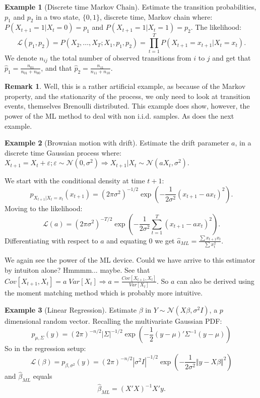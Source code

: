 \documentclass[12pt,a4paper]{article}
\theoremstyle{plain}
\theoremstyle{definition}
\newtheorem{remark}{Remark}
\newtheorem{example}{Example}
\newcommand{\gauss}[1]{\mathcal{N}(#1)}
\newcommand{\norm}[1]{\Vert #1 \Vert}
\newcommand{\lik}{\mathcal{L}}
\begin{document}
\begin{example}[Discrete time Markov Chain]

Estimate the transition probabilities,  $p_1$ and $p_2$ in a two state, $\{0,1\}$, discrete time, Markov chain where:
$P(X_{t+1}=1|X_{t}=0)=p_1$ and $P(X_{t+1}=1|X_{t}=1)=p_2$.
The likelihood:
$$
  \lik(p_1,p_2)=
  P(X_2,\dots,X_T;X_1,p_1,p_2)=
  \prod_{t=1}^T P(X_{t+1}=x_{t+1}|X_{t}=x_t).
$$
We denote $n_{ij}$ the total number of observed transitions from $i$ to $j$ and get that $\hat{p}_1=\frac{n_{01}}{n_{01}+n_{00}}$, and that $\hat{p}_2=\frac{n_{11}}{n_{11}+n_{10}}$.

\begin{remark}
Well, this is a rather artificial example, as because of the Markov property, and the stationarity of the process, we only need to look at transition events, themselves Brenoulli distributed. 
This example does show, however, the power of the ML method to deal with non i.i.d. samples. As does the next example.
\end{remark}
\end{example}

\begin{example}[Brownian motion with drift]
Estimate the drift parameter $a$,  in a discrete time Gaussian process where:
$X_{t+1}=X_t+\varepsilon; \varepsilon \sim \gauss{0,\sigma^2} \Rightarrow X_{t+1}|X_t \sim \gauss{a X_t,\sigma^2}$.

We start with the conditional density at time $t+1$:
$$
  p_{X_{t+1}|X_t=x_t}(x_{t+1}) = 
  (2 \pi \sigma^2)^{-1/2} \exp \left( 
    -\frac{1}{2 \sigma^2}(x_{t+1}-a x_t)^2 
  \right).
$$
Moving to the likelihood:
$$
  \lik(a) = 
  (2 \pi \sigma^2)^{-T/2} \exp \left(
    -\frac{1}{2 \sigma^2}\sum_{t=1}^T (x_{t+1}-a x_t)^2 
  \right).
$$
Differentiating with respect to $a$ and equating $0$ we get $\hat{a}_{ML}=\frac{\sum x_{t+1}x_{t}}{\sum x_t^2}$.

We again see the power of the ML device.
Could we have arrive to this estimator by intuiton alone? Hmmmm... maybe. 
See that $Cov[X_{t+1},X_t] = a \; Var[X_t] \Rightarrow a=\frac{Cov[X_{t+1},X_t]}{Var[X_t]}$.
So $a$ can also be derived using the moment matching method which is probably more intuitive.

\end{example}

\begin{example}[Linear Regression]

Estimate $\beta$ in $Y \sim \gauss{X\beta,\sigma^2 I}$, a $p$ dimensional random vector.
Recalling the multivariate Gaussian PDF:
$$
  p_{\mu,\Sigma}(y) = 
  (2 \pi)^{-n/2} |\Sigma|^{-1/2} \exp\left(
    -\frac{1}{2} (y-\mu)' \Sigma^{-1} (y-\mu)
  \right)
$$
So in the regression setup:
$$
  \lik(\beta)= 
  p_{\beta,\sigma^2}(y) = 
  (2 \pi)^{-n/2} |\sigma^2 I|^{-1/2} \exp\left(
    -\frac{1}{2 \sigma^2} \norm{y-X\beta}^2
  \right)
$$
and $\hat{\beta}_{ML}$ equals 
\begin{align}
	\hat{\beta}_{ML}=(X'X)^{-1} X'y.
\end{align}


\end{example}
\end{document}
